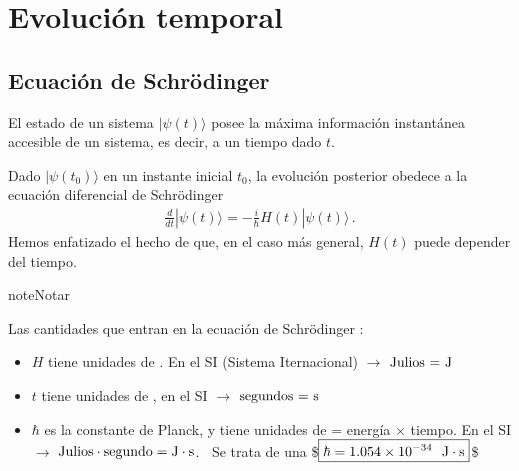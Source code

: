 \documentclass[letterpaper,10pt,english]{jupyterBook}
\newcommand{\ket}[1]{|#1\rangle}
\begin{document}
\section{Evolución temporal}
\label{\detokenize{docs/Part_01_Formalismo/Chapter_02_01_Fundamentos_MC_myst:evolucion-temporal}}

\subsection{Ecuación de Schrödinger}
\label{\detokenize{docs/Part_01_Formalismo/Chapter_02_01_Fundamentos_MC_myst:ecuacion-de-schrodinger}}
\sphinxAtStartPar
El estado de un sistema \(\ket{\psi(t)}\) posee la máxima información instantánea accesible de un sistema, es decir, a un tiempo dado \(t\).

\sphinxAtStartPar
Dado \(\ket{\psi(t_0)}\) en un instante inicial \(t_0\), la evolución posterior obedece a la  ecuación diferencial de Schrödinger
\begin{equation*}
\begin{split}
 \displaystyle \frac{d}{d t}\ket{\psi(t)} =-\frac{i}{\hbar} H(t) \ket{\psi(t)} \, .
\end{split}
\end{equation*}
\sphinxAtStartPar
Hemos enfatizado el hecho de que, en el caso más general, \(H(t)\) puede depender del tiempo.

\begin{sphinxadmonition}{note}{Notar}

\sphinxAtStartPar
Las cantidades que entran en la ecuación de Schrödinger :
\begin{itemize}
\item {} 
\sphinxAtStartPar
\(H\) tiene unidades de . En el SI (Sistema Iternacional) \(\to\) \(\hbox{Julios = J}\)

\item {} 
\sphinxAtStartPar
\(t\) tiene unidades de , en el SI \(\to\) \(\hbox{segundos = s}\)

\item {} 
\sphinxAtStartPar
\(\hbar\) es la constante de Planck, y  tiene unidades de = energía \(\times\)  tiempo. En el SI  \(\to \) \(\hbox{Julios}\cdot\hbox{segundo} =  \hbox{J}\cdot\hbox{s}\). \(~\) Se trata de una 
\$\(
\boxed{\hbar = 1.054\times 10^{-34}~~ \hbox{J}\cdot\hbox{s}}
\)\$

\end{itemize}
\end{sphinxadmonition}
\end{document}
